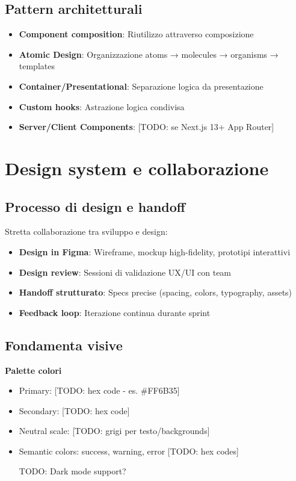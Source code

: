 \subsection{Pattern architetturali}
\begin{itemize}
  \item \textbf{Component composition}: Riutilizzo attraverso composizione
  \item \textbf{Atomic Design}: Organizzazione atoms → molecules → organisms → templates
  \item \textbf{Container/Presentational}: Separazione logica da presentazione
  \item \textbf{Custom hooks}: Astrazione logica condivisa
  \item \textbf{Server/Client Components}: [TODO: se Next.js 13+ App Router]
\end{itemize}

\section{Design system e collaborazione}
\subsection{Processo di design e handoff}
Stretta collaborazione tra sviluppo e design:
\begin{itemize}
  \item \textbf{Design in Figma}: Wireframe, mockup high-fidelity, prototipi interattivi
  \item \textbf{Design review}: Sessioni di validazione UX/UI con team
  \item \textbf{Handoff strutturato}: Specs precise (spacing, colors, typography, assets)
  \item \textbf{Feedback loop}: Iterazione continua durante sprint
\end{itemize}

\subsection{Fondamenta visive}
\textbf{Palette colori}
\begin{itemize}
  \item Primary: [TODO: hex code - es. \#FF6B35]
  \item Secondary: [TODO: hex code]
  \item Neutral scale: [TODO: grigi per testo/backgrounds]
  \item Semantic colors: success, warning, error [TODO: hex codes]
  \item [TODO: Dark mode support?]
\end{itemize}


